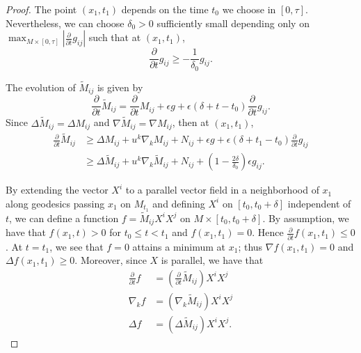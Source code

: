 \begin{proof}
	The point $(x_1,t_1)$ depends on the time $t_0$ we choose in $[0,\tau]$. Nevertheless, we can choose $\delta_0>0$ sufficiently small depending only on $\max_{M \times [0,\tau ]} \left| \frac{\partial }{\partial t} g_{ij }^{}  \right|$ such that at $(x_1,t_1)$,
	\[\frac{\partial }{\partial t} g_{ij }^{} \geq -\frac{1}{\delta_0 }g_{ij }^{} .\]

	The evolution of $\tilde{M}_{ij }$ is given by 
	\[\frac{\partial }{\partial t} \tilde{M}_{ij }^{} = \frac{\partial }{\partial t} M_{ij }^{} + \epsilon g+\epsilon (\delta +t-t_0) \frac{\partial }{\partial t}  g_{ij}^{}.\]
	Since $\Delta \tilde{M}_{ij}=\Delta M_{ij}$ and $\nabla \tilde{M}_{ij}=\nabla M_{ij}$, then at $(x_1,t_1)$,  
	\begin{equation*}
	\begin{split}
		\frac{\partial }{\partial t} \tilde{M}_{ij }^{} &\geq \Delta M_{ij }^{} + u^k \nabla_{k}^{} M_{ij }^{}+ N_{ij }^{}+ \epsilon g+\epsilon (\delta +t_1-t_0) \frac{\partial }{\partial t}  g_{ij}^{}\\
	&\geq \Delta \tilde{M}_{ij }^{}+ u^k \nabla_{k}^{} \tilde{M}_{ij }^{} + N_{ij }^{} + (1-\frac{2 \delta }{\delta_0})\epsilon g_{ij }^{}. 
	\end{split}
	\end{equation*}

	By extending the vector $X^i$ to a parallel vector field in a neighborhood of $x_1$ along geodesics passing $x_1$ on $M_{t_1}$ and defining $X^i$ on $[t_0,t_0+\delta]$ independent of $t$, we can define a function $f=\tilde{M}_{ij }^{} X^i X^j$ on $M \times [t_0,t_0+\delta]$. By assumption, we have that $f (x_1,t) > 0 $ for $t_0 \leq t<t_1$ and $f ( x_1,t_1) =0$. Hence $\frac{\partial }{\partial t} f(x_1,t_1) \leq 0$. At $t=t_1$, we see that $f=0$ attains a minimum at $x_1$; thus $\nabla f(x_1,t_1)=0$ and $\Delta f(x_1,t_1) \geq 0$.
	Moreover, since $X$ is parallel, we have that
	\begin{align*}
		\frac{\partial }{\partial t} f&=(\frac{\partial }{\partial t} \tilde{M}_{ij }^{}) X^i X^j\\
		\nabla_k f&= (\nabla_k \tilde{M}_{ij }^{}) X^i X^j \\
		\Delta f &= (\Delta  \tilde{M}_{ij }^{}) X^i X^j.
	\end{align*}


\end{proof}

